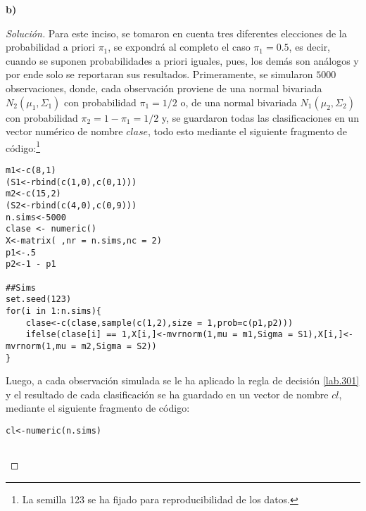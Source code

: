 \documentclass[10.5pt,notitlepage]{article}
\newenvironment{solucion}
  {\begin{proof}[Solución]}
  {\end{proof}}
\theoremstyle{plain}
\begin{document}
\textbf{b)}
\begin{solucion}
Para este inciso, se tomaron en cuenta tres diferentes elecciones de la probabilidad a priori \(\pi_1\), se expondrá al completo el caso \(\pi_1 = 0.5\), es decir, cuando se suponen probabilidades a priori iguales, pues, los demás son análogos y por ende solo se reportaran sus resultados. Primeramente, se simularon \(5000\) observaciones, donde, cada observación proviene de una normal bivariada \(N_{2}(\mu_1, \Sigma_1)\) con probabilidad \(\pi_1 = 1/2\) o, de una normal bivariada \(N_{1}(\mu_2, \Sigma_2)\) con probabilidad \(\pi_2 = 1 - \pi_1 =1/2\) y, se guardaron todas las clasificaciones en un vector numérico de nombre \(clase\), todo esto mediante el siguiente fragmento de código:\footnote{La semilla 123 se ha fijado para reproducibilidad de los datos.}
\begin{verbatim}
m1<-c(8,1)
(S1<-rbind(c(1,0),c(0,1)))
m2<-c(15,2)
(S2<-rbind(c(4,0),c(0,9)))
n.sims<-5000 
clase <- numeric()
X<-matrix( ,nr = n.sims,nc = 2)
p1<-.5
p2<-1 - p1

##Sims
set.seed(123)
for(i in 1:n.sims){
    clase<-c(clase,sample(c(1,2),size = 1,prob=c(p1,p2)))
    ifelse(clase[i] == 1,X[i,]<-mvrnorm(1,mu = m1,Sigma = S1),X[i,]<-mvrnorm(1,mu = m2,Sigma = S2))
}
\end{verbatim}
Luego, a cada observación simulada se le ha aplicado la regla de decisión \eqref{lab.301} y el resultado de cada clasificación se ha guardado en un vector de nombre \(cl\), mediante el siguiente fragmento de código: 
\begin{verbatim}
cl<-numeric(n.sims)


\end{verbatim}
\end{solucion}
\end{document}
